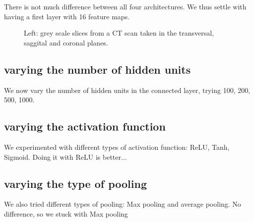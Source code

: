 There is not much difference between all four architectures. We thus settle with having a first layer with 16 feature maps.

\begin{figure}
\centering
{}
\caption{Left: grey scale slices from a CT scan taken in the transversal, saggital and coronal planes.}
\end{figure}

\subsection{varying the number of hidden units}

We now vary the number of hidden units in the connected layer, trying 100, 200, 500, 1000. 



\subsection{varying the activation function}

We experimented with different types of activation function: ReLU, Tanh, Sigmoid. Doing it with ReLU is better...




\subsection{varying the type of pooling}

We also tried different types of pooling: Max pooling and average pooling. No difference, so we stuck with Max pooling




